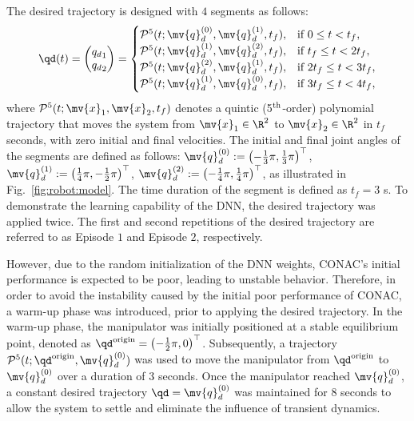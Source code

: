 \documentclass[journal]{IEEEtran}
\begin{document}
The desired trajectory is designed with $4$ segments as follows:
\begin{equation}
    \qd(t) 
    =
    \begin{pmatrix}
        {q_d}_1
        \\
        {q_d}_2
    \end{pmatrix}
    =
    \begin{cases}
    \mathcal{P}^5(t;\mv{q}_d^{(0)},\mv{q}_d^{(1)},t_f),
        &
        \text{if } 0 \le t < t_f 
        ,
        \\
    \mathcal{P}^5(t;\mv{q}_d^{(1)},\mv{q}_d^{(2)},t_f),
        &
        \text{if } t_f \le t < 2t_f 
        ,
        \\
    \mathcal{P}^5(t;\mv{q}_d^{(2)},\mv{q}_d^{(1)},t_f),
        & 
        \text{if } 2t_f \le t < 3t_f 
        ,
        \\
    \mathcal{P}^5(t;\mv{q}_d^{(1)},\mv{q}_d^{(0)},t_f),
        &    
        \text{if } 3t_f \le t < 4t_f 
        ,
        \\
    \end{cases} 
    \label{eq:desired trajectory}
\end{equation}
where $\mathcal{P}^5(t;\mv{x}_1,\mv{x}_2,t_f)$ denotes a quintic (5$\textsuperscript{th}$-order) polynomial trajectory that moves the system from $\mv{x}_1\in\R^2$ to $\mv{x}_2\in\R^2$ in $t_f$ seconds, with zero initial and final velocities.
The initial and final joint angles of the segments are defined as follows:
$
    \mv{q}_d^{(0)}:=\left(-\tfrac{1}{3}\pi,\tfrac{1}{3}\pi\right)^\top
$, 
$
    \mv{q}_d^{(1)}:=\left(\tfrac{1}{4}\pi,-\tfrac{1}{2}\pi\right)^\top
$, 
$
    \mv{q}_d^{(2)}:=\left(-\tfrac{1}{4}\pi,\tfrac{1}{4}\pi\right)^\top
$, as illustrated in Fig.~\ref{fig:robot:model}.
The time duration of the segment is defined as $t_f=3$ s.
To demonstrate the learning capability of the DNN, the desired trajectory was applied twice. 
The first and second repetitions of the desired trajectory are referred to as Episode $1$ and Episode $2$, respectively.

However, due to the random initialization of the DNN weights, CONAC's initial performance is expected to be poor, leading to unstable behavior.
Therefore, in order to avoid the instability caused by the initial poor performance of CONAC, a warm-up phase was introduced, prior to applying the desired trajectory.
In the warm-up phase, the manipulator was initially positioned at a stable equilibrium point, denoted as ${\qd}^{\rm{origin}} = \left(-\tfrac{1}{2}\pi, 0\right)^\top$.
Subsequently, a trajectory $\mathcal{P}^5(t; {\qd}^{\rm{origin}}, \mv{q}_d^{(0)})$ was used to move the manipulator from ${\qd}^{\rm{origin}}$ to $\mv{q}_d^{(0)}$ over a duration of 3 seconds.
Once the manipulator reached $\mv{q}_d^{(0)}$, a constant desired trajectory $\qd = \mv{q}_d^{(0)}$ was maintained for 8 seconds to allow the system to settle and eliminate the influence of transient dynamics.
\end{document}
